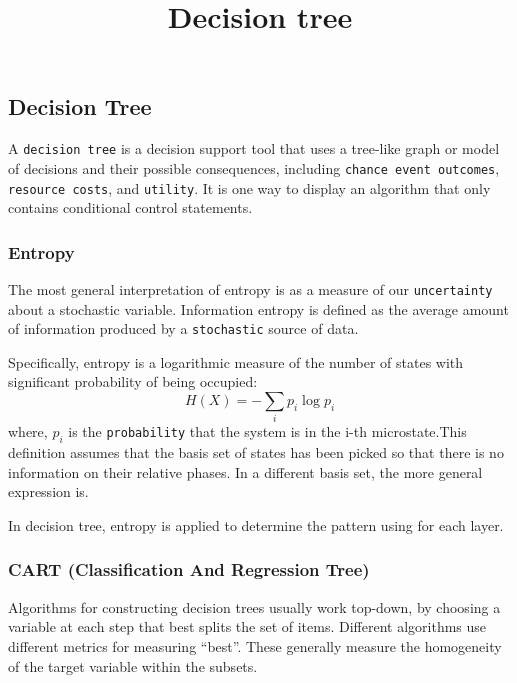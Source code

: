 \documentclass[11pt]{article}
\title{Decision tree}
\begin{document}
    
    
    \maketitle
    
    

    
    \hypertarget{decision-tree}{%
\subsection{Decision Tree}\label{decision-tree}}

A \texttt{decision\ tree} is a decision support tool that uses a
tree-like graph or model of decisions and their possible consequences,
including \texttt{chance\ event\ outcomes}, \texttt{resource\ costs},
and \texttt{utility}. It is one way to display an algorithm that only
contains conditional control statements. 

    \hypertarget{entropy}{%
\subsubsection{Entropy}\label{entropy}}

The most general interpretation of entropy is as a measure of our
\texttt{uncertainty} about a stochastic variable. Information entropy is
defined as the average amount of information produced by a
\texttt{stochastic} source of data.

Specifically, entropy is a logarithmic measure of the number of states
with significant probability of being occupied:
\[ H(X)=-\sum _{i}p_{i}\log p_{i} \] where, \(p_{i}\) is the
\texttt{probability} that the system is in the i-th microstate.This
definition assumes that the basis set of states has been picked so that
there is no information on their relative phases. In a different basis
set, the more general expression is.

In decision tree, entropy is applied to determine the pattern using for
each layer.

    \hypertarget{cart-classification-and-regression-tree}{%
\subsubsection{CART (Classification And Regression
Tree)}\label{cart-classification-and-regression-tree}}

Algorithms for constructing decision trees usually work top-down, by
choosing a variable at each step that best splits the set of items.
Different algorithms use different metrics for measuring ``best''. These
generally measure the homogeneity of the target variable within the
subsets.
\end{document}
